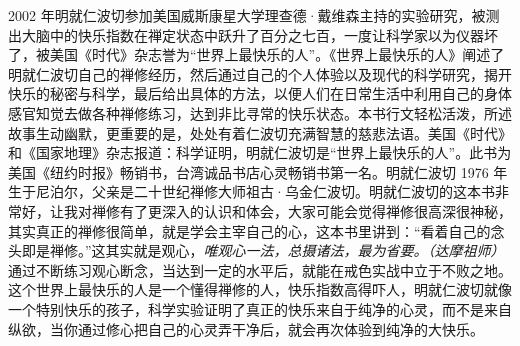 \begin{book}
    2002 年明就仁波切参加美国威斯康星大学理查德·戴维森主持的实验研究，被测出大脑中的快乐指数在禅定状态中跃升了百分之七百，一度让科学家以为仪器坏了，被美国《时代》杂志誉为“世界上最快乐的人”。《世界上最快乐的人》阐述了明就仁波切自己的禅修经历，然后通过自己的个人体验以及现代的科学研究，揭开快乐的秘密与科学，最后给出具体的方法，以便人们在日常生活中利用自己的身体感官知觉去做各种禅修练习，达到非比寻常的快乐状态。本书行文轻松活泼，所述故事生动幽默，更重要的是，处处有着仁波切充满智慧的慈悲法语。美国《时代》和《国家地理》杂志报道：科学证明，明就仁波切是“世界上最快乐的人”。此书为美国《纽约时报》畅销书，台湾诚品书店心灵畅销书第一名。明就仁波切 1976 年生于尼泊尔，父亲是二十世纪禅修大师祖古·乌金仁波切。明就仁波切的这本书非常好，让我对禅修有了更深入的认识和体会，大家可能会觉得禅修很高深很神秘，其实真正的禅修很简单，就是学会主宰自己的心，这本书里讲到：“看着自己的念头即是禅修。”这其实就是观心，\textit{唯观心一法，总摄诸法，最为省要。（达摩祖师）} 通过不断练习观心断念，当达到一定的水平后，就能在戒色实战中立于不败之地。这个世界上最快乐的人是一个懂得禅修的人，快乐指数高得吓人，明就仁波切就像一个特别快乐的孩子，科学实验证明了真正的快乐来自于纯净的心灵，而不是来自纵欲，当你通过修心把自己的心灵弄干净后，就会再次体验到纯净的大快乐。
\end{book}
